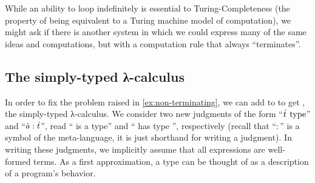 \documentclass[./thesis.tex]{subfiles}
\begin{document}
While an ability to loop indefinitely is essential to Turing-Completeness (the
property of being equivalent to a Turing machine model of computation), we
might ask if there is another system in which we could express many of the same
ideas and computations, but with a computation rule that always ``terminates''.

\subsection{The simply-typed λ-calculus}
\label{subsec:the-simply-typed-lambda-calculus}

In order to fix the problem raised in \cref{ex:non-terminating}, we can add
 to \LC{} to get
\STLC{}, the simply-typed λ-calculus. We consider two new judgments
of the form ``$\dot{t}\hspace{0.4em}\text{type}$'' and ``$\dot{a}:\dot{t}$'', read
`` is a type'' and `` has type '', respectively (recall
that ``$:$'' is a symbol of the meta-language, it is just shorthand for writing
a judgment). In writing these judgments, we implicitly assume that all
expressions are well-formed terms. As a first approximation, a type can be
thought of as a description of a program's behavior.
\end{document}
